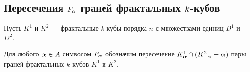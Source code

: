 \subsection{Пересечения $F_\alpha$ граней фрактальных $k$-кубов}

Пусть $K^1$ и $K^2$ --- фрактальные $k$-кубы порядка $n$ с множествами единиц $D^1$ и $D^2$.

\begin{definition}\label{def:F_alpha}
Для любого ${\bm{\alpha}}\in A$ символом $F_{\bm{\alpha}}$ обозначим пересечение $K^1_{\bm{\alpha}}\cap(K^2_{-{\bm{\alpha}}}+{\bm{\alpha}})$ пары граней фрактальных $k$-кубов $K^1$ и $K^2$.
\end{definition}

%
%
%
%

